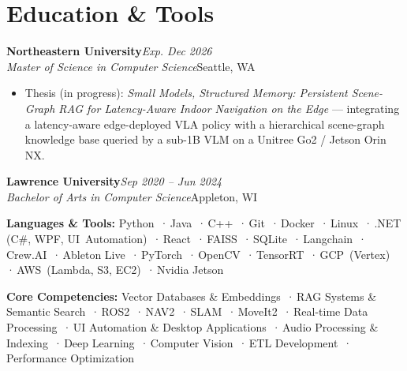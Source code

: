 \documentclass[11pt, letterpaper]{article}
\newcommand{\bull}{\,·\,}
\newcommand{\entrysub}[2]{%
    \noindent\textit{#1}\hfill#2\\[-5pt]%
}
\newcommand{\eduhead}[2]{%
    \noindent\textbf{#1}\hfill\textit{#2}\\%
}
\begin{document}
\section{Education \& Tools}

\eduhead{Northeastern University}{Exp. Dec 2026}
\entrysub{Master of Science in Computer Science}{Seattle, WA}
\begin{itemize}
    \item Thesis (in progress): \textit{Small Models, Structured Memory: Persistent Scene-Graph RAG for Latency-Aware Indoor Navigation on the Edge} --- integrating a latency-aware edge-deployed VLA policy with a hierarchical scene-graph knowledge base queried by a sub-1B VLM on a Unitree Go2 / Jetson Orin NX.
\end{itemize}

\vspace{6pt}

\eduhead{Lawrence University}{Sep 2020 -- Jun 2024}
\entrysub{Bachelor of Arts in Computer Science}{Appleton, WI}

\vspace{8pt}

\noindent\textbf{Languages \& Tools:}
Python \bull Java \bull C++ \bull Git \bull Docker \bull Linux \bull .NET (C\#, WPF, UI~Automation) \bull React \bull FAISS \bull SQLite \bull Langchain \bull Crew.AI \bull Ableton Live \bull PyTorch \bull OpenCV \bull TensorRT \bull GCP~(Vertex) \bull AWS~(Lambda, S3, EC2) \bull Nvidia Jetson

\vspace{4pt}

\noindent\textbf{Core Competencies:}
Vector Databases \& Embeddings \bull RAG Systems \& Semantic Search \bull ROS2 \bull NAV2 \bull SLAM \bull MoveIt2 \bull Real-time Data Processing \bull UI Automation \& Desktop Applications \bull Audio Processing \& Indexing \bull Deep Learning \bull Computer Vision \bull ETL Development \bull Performance Optimization
\end{document}
